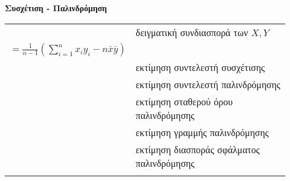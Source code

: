 \documentclass[12pt]{article}
\begin{document}
\renewcommand{\arraystretch}{2}

\textbf{Συσχέτιση - Παλινδρόμηση}

\begin{tabular}{|l|l|}
\hl

    $s_{XY}=\frac{1}{n-1} \sum_{i=1}^n(x_i-\bar{x})(y_i-\bar{y})$ & δειγματική συνδιασπορά των $X,Y$  \\[-0.4cm]
    $=\frac{1}{n-1}(\sum_{i=1}^nx_iy_i-n\bar{x}\bar{y})$ &\\
\hl

    $r=\frac{s_{XY}}{s_Xs_Y}$ \ts $r= \sqrt{1-\frac{s_{Y|X}^2}{s_Y^2}}=b\frac{s_X}{s_Y}$ & εκτίμηση συντελεστή συσχέτισης\\
\hl

    $b=\frac{s_{XY}}{s_X^2}$ & εκτίμηση συντελεστή παλινδρόμησης\\
\hl

    $a=\bar{y}-b \bar{x}$& \makecell[l]{εκτίμηση σταθερού όρου\\παλινδρόμησης}\\
\hl

    $\hat{y}=a+bx$ & εκτίμηση γραμμής παλινδρόμησης\\
\hl

    $s_{Y|X}^2=s^2=\frac{n-1}{n-2}\left(s_Y^2-\frac{s_{XY}^2}{s_X^2}\right)=\frac{n-1}{n-2}(s_Y^2-b^2s_X^2)$ & \makecell[l]{εκτίμηση διασποράς σφάλματος\\παλινδρόμησης}\\
\hl    
\end{tabular}
\end{document}
